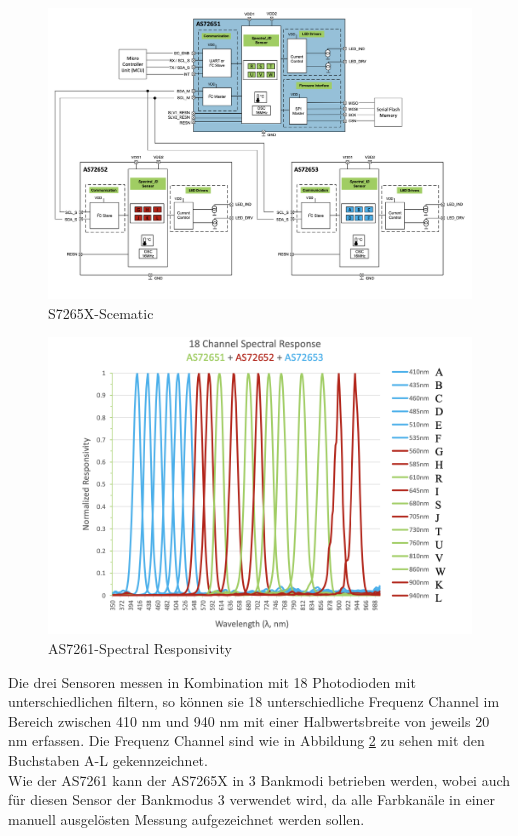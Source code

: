 \begin{figure}[H]
  \centering
 \includegraphics[width=0.9\linewidth]{img/AS7265X-Scematic.png}
 \caption{S7265X-Scematic\cite{Datenblatt_AS7265X}}
  \label{fig:S7265X-Scematic}
\end{figure}


\begin{figure}[H]
  \centering
 \includegraphics[width=0.9\linewidth]{img/AS7265X-Spectral_Responsivity.png}
 \caption{AS7261-Spectral Responsivity \cite{Datenblatt_AS7265X}}
  \label{fig:AS7261-Spectral_Responsivity}
\end{figure}

\noindent Die drei Sensoren messen in Kombination mit 18  Photodioden mit unterschiedlichen filtern, so können sie 18 unterschiedliche Frequenz Channel im Bereich zwischen 410 nm und 940 nm mit einer Halbwertsbreite von jeweils 20 nm erfassen.
Die Frequenz Channel sind wie in Abbildung \ref{fig:AS7261-Spectral_Responsivity} zu sehen mit den Buchstaben A-L gekennzeichnet.\\
Wie der AS7261 kann der AS7265X in 3 Bankmodi betrieben werden, wobei auch für diesen Sensor der Bankmodus 3 verwendet wird, da alle Farbkanäle in einer manuell ausgelösten Messung aufgezeichnet werden sollen.
\newpage
